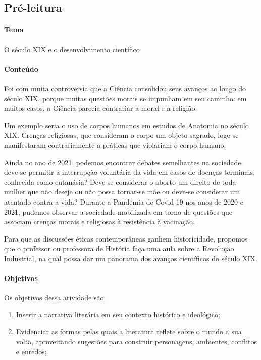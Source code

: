 \documentclass[12pt]{extarticle}
\begin{document}
{\subsection{Pré-leitura}

\paragraph{Tema} O século XIX e o desenvolvimento científico


\paragraph{Conteúdo}
Foi com muita controvérsia que a Ciência consolidou seus avanços ao
longo do século XIX, porque muitas questões morais se impunham em seu
caminho: em muitos casos, a Ciência parecia contrariar a moral e a
religião.

Um exemplo seria o uso de corpos humanos em estudos de Anatomia no
século XIX. Crenças religiosas, que consideram o corpo um objeto
sagrado, logo se manifestaram contrariamente a práticas que violariam o
corpo humano.

Ainda no ano de 2021, podemos encontrar debates semelhantes na
sociedade: deve-se permitir a interrupção voluntária da vida em casos de
doenças terminais, conhecida como eutanásia? Deve-se considerar o aborto
um direito de toda mulher que não deseje ou não possa tornar-se mãe ou
deve-se considerar um atentado contra a vida? Durante a Pandemia de
Covid 19 nos anos de 2020 e 2021, pudemos observar a sociedade
mobilizada em torno de questões que associam crenças morais e religiosas
à resistência à vacinação.

Para que as discussões éticas contemporâneas ganhem historicidade,
propomos que o professor ou professora de História faça uma aula sobre a
Revolução Industrial, na qual possa dar um panorama dos avanços
científicos do século XIX. 


\paragraph{Objetivos}
Os objetivos dessa atividade são:

\begin{enumerate}
\item
Inserir a narrativa literária em
seu contexto histórico e ideológico; 

\item
Evidenciar as formas pelas quais
a literatura reflete sobre o mundo a sua volta, aproveitando sugestões
para construir personagens, ambientes, conflitos e enredos;


\end{enumerate}}
\end{document}
